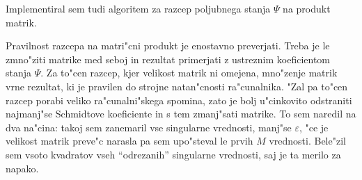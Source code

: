\documentclass[a4paper,10pt]{article}
\begin{document}
Implementiral sem tudi algoritem za razcep poljubnega stanja $\Psi$ na produkt matrik. 

Pravilnost razcepa na matri"cni produkt je enostavno preverjati. 
Treba je le zmno"ziti matrike med seboj in rezultat primerjati z ustreznim koeficientom stanja $\Psi$. 
Za to"cen razcep, kjer velikost matrik ni omejena, mno"zenje matrik vrne rezultat, ki je pravilen do strojne natan"cnosti ra"cunalnika. 
"Zal pa to"cen razcep porabi veliko ra"cunalni"skega spomina, zato je bolj u"cinkovito odstraniti najmanj"se Schmidtove koeficiente in s tem zmanj"sati matrike. 
To sem naredil na dva na"cina: takoj sem zanemaril vse singularne vrednosti, manj"se $\varepsilon$, "ce je velikost matrik preve"c narasla pa sem upo"steval le prvih $M$ vrednosti. 
Bele"zil sem vsoto kvadratov vseh ``odrezanih'' singularne vrednosti, saj je ta merilo za napako. 
\end{document}
